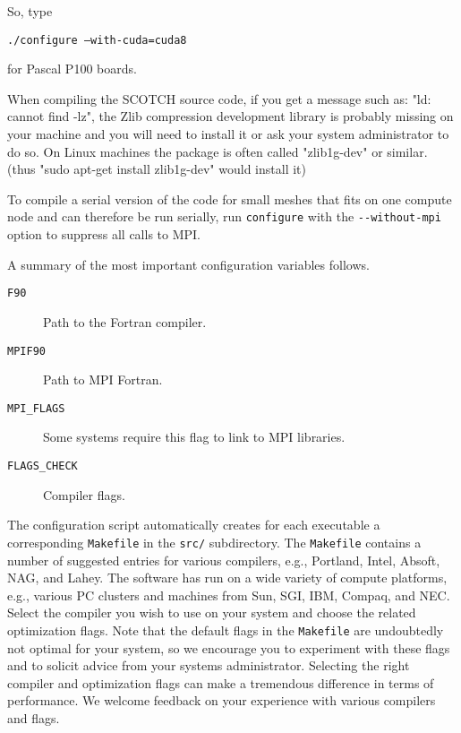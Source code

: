So, type

\texttt{./configure --with-cuda=cuda8}

for Pascal P100 boards.

When compiling the SCOTCH source code, if you get a message such as: "ld: cannot find -lz",
the Zlib compression development library is probably missing on your machine and you will need to install it or ask your system administrator to
do so. On Linux machines the package is often called "zlib1g-dev" or similar. (thus "sudo apt-get install zlib1g-dev" would install it)

To compile a serial version of the code for small meshes that fits
on one compute node and can therefore be run serially, run \texttt{configure}
with the \texttt{-{}-without-mpi} option to suppress all calls to
MPI.

A summary of the most important configuration variables follows.
\begin{description}
\item [{\texttt{F90}}] Path to the Fortran compiler.
\item [{\texttt{MPIF90}}] Path to MPI Fortran.
\item [{\texttt{MPI\_FLAGS}}] Some systems require this flag to link to
MPI libraries.
\item [{\texttt{FLAGS\_CHECK}}] Compiler flags.
\end{description}
The configuration script automatically creates for each executable
a corresponding \texttt{Makefile} in the \texttt{src/} subdirectory.
The \texttt{Makefile} contains a number of suggested entries for various
compilers, e.g., Portland, Intel, Absoft, NAG, and Lahey. The software
has run on a wide variety of compute platforms, e.g., various PC clusters
and machines from Sun, SGI, IBM, Compaq, and NEC. Select the compiler
you wish to use on your system and choose the related optimization
flags. Note that the default flags in the \texttt{Makefile} are undoubtedly
not optimal for your system, so we encourage you to experiment with
these flags and to solicit advice from your systems administrator.
Selecting the right compiler and optimization flags can make a tremendous
difference in terms of performance. We welcome feedback on your experience
with various compilers and flags.

